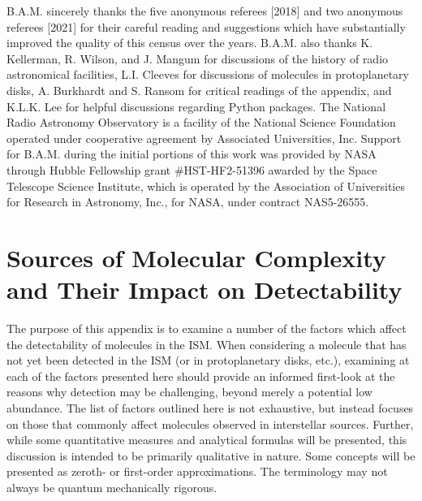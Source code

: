 \documentclass[twocolumn]{aastex631}
\newcommand{\update}[1]{{#1}}
\begin{document}
\begin{acknowledgements}

B.A.M. sincerely thanks the five anonymous referees [2018] and two anonymous referees [2021] for their careful reading and suggestions which have substantially improved the quality of this census over the years.  \update{B.A.M. also thanks K. Kellerman, R. Wilson, and J. Mangum for discussions of the history of radio astronomical facilities, L.I. Cleeves for discussions of molecules in protoplanetary disks, A. Burkhardt and S. Ransom for critical readings of the appendix, and K.L.K. Lee for helpful discussions regarding Python packages.}  The National Radio Astronomy Observatory is a facility of the National Science Foundation operated under cooperative agreement by Associated Universities, Inc. Support for B.A.M. \update{during the initial portions of this work} was provided by NASA through Hubble Fellowship grant \#HST-HF2-51396 awarded by the Space Telescope Science Institute, which is operated by the Association of Universities for Research in Astronomy, Inc., for NASA, under contract NAS5-26555. 

\end{acknowledgements}

\appendix

\renewcommand\thefigure{\thesection\arabic{figure}}   
\renewcommand\thetable{\thesection\arabic{table}}    

\setcounter{figure}{0}    
\setcounter{table}{0} 

\twocolumngrid

\section{Sources of Molecular Complexity and Their Impact on Detectability}
\label{app:complexity}

The purpose of this appendix is to examine a number of the factors which affect the detectability of molecules in the ISM.  When considering a molecule that has not yet been detected in the ISM (or in protoplanetary disks, etc.), examining at each of the factors presented here should provide an informed first-look at the reasons why detection may be challenging, beyond merely a potential low abundance.   The list of factors outlined here is not exhaustive, but instead focuses on those that commonly affect molecules observed in interstellar sources.  Further, while some quantitative measures and analytical formulas will be presented, this discussion is intended to be primarily qualitative in nature.  Some concepts will be presented as zeroth- or first-order approximations. The terminology may not always be quantum mechanically rigorous.
\end{document}
